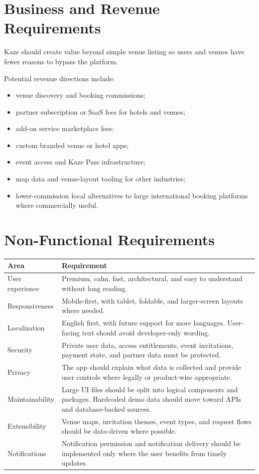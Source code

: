 \documentclass[11pt,a4paper]{article}
\begin{document}
\section{Business and Revenue Requirements}

Kaze should create value beyond simple venue listing so users and venues have fewer reasons to bypass the platform.

Potential revenue directions include:

\begin{itemize}
    \item venue discovery and booking commissions;
    \item partner subscription or SaaS fees for hotels and venues;
    \item add-on service marketplace fees;
    \item custom branded venue or hotel apps;
    \item event access and Kaze Pass infrastructure;
    \item map data and venue-layout tooling for other industries;
    \item lower-commission local alternatives to large international booking platforms where commercially useful.
\end{itemize}

\section{Non-Functional Requirements}

\begin{longtable}{p{} p{}}
\textbf{Area} & \textbf{Requirement} \\
\midrule
User experience & Premium, calm, fast, architectural, and easy to understand without long reading. \\
Responsiveness & Mobile-first, with tablet, foldable, and larger-screen layouts where needed. \\
Localization & English first, with future support for more languages. User-facing text should avoid developer-only wording. \\
Security & Private user data, access entitlements, event invitations, payment state, and partner data must be protected. \\
Privacy & The app should explain what data is collected and provide user controls where legally or product-wise appropriate. \\
Maintainability & Large UI files should be split into logical components and packages. Hardcoded demo data should move toward APIs and database-backed sources. \\
Extensibility & Venue maps, invitation themes, event types, and request flows should be data-driven where possible. \\
Notifications & Notification permission and notification delivery should be implemented only where the user benefits from timely updates. \\
\end{longtable}
\end{document}
